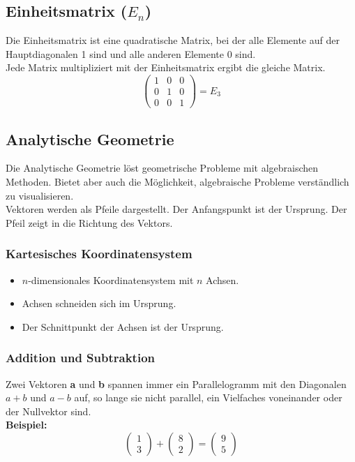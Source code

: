 \documentclass[12pt,a4paper]{article}
\begin{document}
\subsection{Einheitsmatrix ($E_n$)}
Die Einheitsmatrix ist eine quadratische Matrix, bei der alle Elemente auf der Hauptdiagonalen 1 sind und alle anderen Elemente 0 sind. \\ Jede Matrix multipliziert mit der Einheitsmatrix ergibt die gleiche Matrix. \\
\[
\begin{pmatrix}
1 & 0 & 0 \\
0 & 1 & 0 \\
0 & 0 & 1
\end{pmatrix}
= E_3
\]

\subsection{Analytische Geometrie}
Die Analytische Geometrie löst geometrische Probleme mit algebraischen Methoden. Bietet aber auch die Möglichkeit, algebraische Probleme verständlich zu visualisieren. \\

Vektoren werden als Pfeile dargestellt. Der Anfangspunkt ist der Ursprung. Der Pfeil zeigt in die Richtung des Vektors. \\

\subsubsection{Kartesisches Koordinatensystem}
\begin{itemize}
    \item $n$-dimensionales Koordinatensystem mit $n$ Achsen.
    \item Achsen schneiden sich im Ursprung.
    \item Der Schnittpunkt der Achsen ist der Ursprung.
\end{itemize}
\subsubsection{Addition und Subtraktion}
Zwei Vektoren \textbf{a} und \textbf{b} spannen immer ein Parallelogramm mit den Diagonalen \textbf{$a+b$} und \textbf{$a-b$} auf, so lange sie nicht parallel, ein Vielfaches voneinander oder der Nullvektor sind. \\

\textbf{Beispiel:}
\[
\begin{pmatrix}
1 \\
3
\end{pmatrix}
+
\begin{pmatrix}
8 \\
2
\end{pmatrix}
=
\begin{pmatrix}
9 \\
5
\end{pmatrix}
\]
\end{document}
